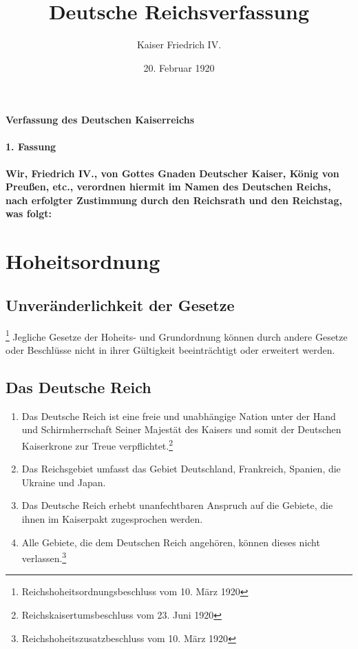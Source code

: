 \documentclass{article}
\title{Deutsche Reichsverfassung}
\author{Kaiser Friedrich IV.}
\date{20. Februar 1920}
\newenvironment*{pg}{\begin{enumerate}[(1)]}{\end{enumerate}}
\begin{document}
\maketitle
\vspace*{\fill}
\paragraph{Verfassung des Deutschen Kaiserreichs}

\newpage
{}
\vspace*{\fill}
\begin{Center}
\textbf{1. Fassung}
\vspace*{\fill}
\end{Center}
\newpage
{}
\vspace*{\fill}
\paragraph*{Wir, Friedrich IV., von Gottes Gnaden Deutscher Kaiser, König von Preußen, etc., verordnen
hiermit im Namen des Deutschen Reichs, nach erfolgter Zustimmung durch den Reichsrath und den Reichstag,
was folgt:}
\vspace*{\fill}
\newpage
\tableofcontents
\newpage
\section{Hoheitsordnung}
\subsection{Unveränderlichkeit der Gesetze}\footnote{Reichshoheitsordnungsbeschluss vom 10. März 1920}
Jegliche Gesetze der Hoheits- und Grundordnung können durch andere Gesetze oder Beschlüsse nicht in ihrer Gültigkeit beeinträchtigt oder erweitert werden.

\subsection{Das Deutsche Reich}
\begin{pg}
    \item Das Deutsche Reich ist eine freie und unabhängige Nation unter der Hand und Schirmherrschaft Seiner Majestät des Kaisers und somit der Deutschen Kaiserkrone zur Treue verpflichtet.\footnote{Reichskaisertumsbeschluss vom 23. Juni 1920}
    \item Das Reichsgebiet umfasst das Gebiet Deutschland, Frankreich, Spanien, die Ukraine und Japan.
    \item Das Deutsche Reich erhebt unanfechtbaren Anspruch auf die Gebiete, die ihnen im Kaiserpakt zugesprochen werden.
    \item Alle Gebiete, die dem Deutschen Reich angehören, können dieses nicht verlassen.\footnote{Reichshoheitszusatzbeschluss vom 10. März 1920}
\end{pg}
\end{document}
